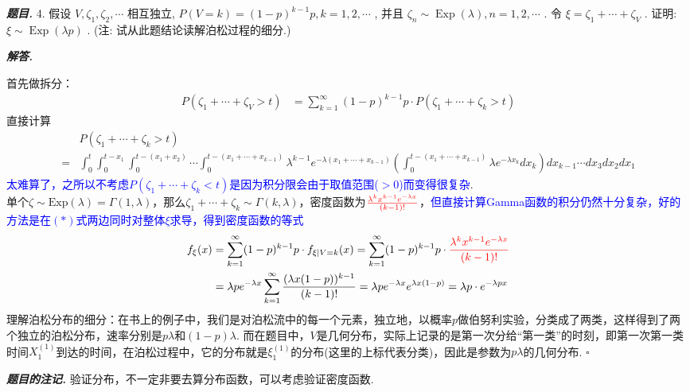 \documentclass[10pt, a4paper, oneside]{ctexart}
\newenvironment{problem}{\begin{framed}\par\noindent\textbf{\textit{题目. }}}{\end{framed}\par}
\newenvironment{solution}{%
  \par\noindent\textbf{\textit{解答. }}\ignorespaces
}{%
  \hfill\ensuremath{\square}\par %
}
\newenvironment{note}{\par\noindent\textbf{\textit{题目的注记. }}\ignorespaces}{\par}
\begin{document}
\begin{problem}
    4. 假设 \( V,{\zeta }_{1},{\zeta }_{2},\cdots  \) 相互独立, \( P\left( {V = k}\right)  = {\left( 1 - p\right) }^{k - 1}p,k = 1,2,\cdots  \) , 并且 \( {\zeta }_{n} \sim  \operatorname{Exp}\left( \lambda \right) ,n = 1,2,\cdots  \) . 令 \( \xi  = {\zeta }_{1} + \cdots  + {\zeta }_{V} \) . 证明: \( \xi  \sim  \operatorname{Exp}\left( {\lambda p}\right)  \) . (注: 试从此题结论读解泊松过程的细分.)
\end{problem}
\begin{solution}
    首先做拆分：
    \begin{align*}
        P(\zeta_1+\cdots+\zeta_V>t)&=\sum_{k=1}^{\infty}(1-p)^{k-1}p\cdot P(\zeta_1+\cdots+\zeta_k>t)\tag{*}
    \end{align*}
    直接计算
    \begin{align*}
        &P(\zeta_1+\cdots+\zeta_k>t)\\
        =&\int_{0}^{t}\int_{0}^{t-x_1}\int_{0}^{t-(x_1+x_2)}\cdots \int_{0}^{t-(x_1+\cdots+x_{k-1})}\lambda^{k-1}e^{-\lambda(x_1+\cdots+x_{k-1})} \left(\int_{0}^{t-(x_1+\cdots+x_{k-1})}\lambda e^{-\lambda x_k} dx_k \right)dx_{k-1}\cdots dx_3 dx_2 dx_1
    \end{align*}
    \textcolor{blue}{太难算了，之所以不考虑$P(\zeta_1+\cdots+\zeta_k<t)$是因为积分限会由于取值范围($>0$)而变得很复杂}.\\
    单个$\zeta\sim \text{Exp}(\lambda) = \Gamma(1 , \lambda)$，那么$\zeta_1+\cdots+\zeta_k\sim \Gamma(k , \lambda)$，密度函数为$\textcolor{red}{\frac{\lambda^k x^{k-1} e^{-\lambda x}}{(k-1)!}}$，\textcolor{blue}{但直接计算Gamma函数的积分仍然十分复杂，好的方法是在$(*)$式两边同时对整体$\xi$求导，得到密度函数的等式}
    \begin{align*}
        f_{\xi}(x)&=\sum_{k=1}^{\infty}(1-p)^{k-1}p\cdot f_{\xi | V=k}(x)=\sum_{k=1}^{\infty}(1-p)^{k-1}p\cdot  \textcolor{red}{\frac{\lambda^k x^{k-1} e^{-\lambda x}}{(k-1)!}}\\
        &=\lambda p e^{-\lambda x} \sum_{k=1}^{\infty} \frac{(\lambda x (1-p))^{k-1}}{(k-1)!}=\lambda p e^{-\lambda x} e^{\lambda x(1-p)}=\lambda p \cdot e^{-\lambda p x}
    \end{align*}
    理解泊松分布的细分：在书上的例子中，我们是对泊松流中的每一个元素，独立地，以概率$p$做伯努利实验，分类成了两类，这样得到了两个独立的泊松分布，速率分别是$p\lambda$和$(1-p)\lambda$. 而在题目中，$V$是几何分布，实际上记录的是第一次分给“第一类”的时刻，即第一次第一类时间$X_1^{(1)}$到达的时间，在泊松过程中，它的分布就是$\xi_1^{(1)}$的分布(这里的上标代表分类)，因此是参数为$p\lambda$的几何分布.
\end{solution}
\begin{note}
    验证分布，不一定非要去算分布函数，可以考虑验证密度函数.
\end{note}
\end{document}
